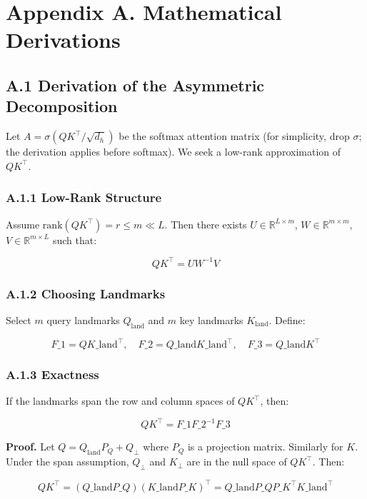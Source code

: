 
\section{Appendix A. Mathematical Derivations}

\subsection{A.1 Derivation of the Asymmetric Decomposition}

Let $A = \sigma(Q K^\top / \sqrt{d_h})$ be the softmax attention matrix (for 
simplicity, drop $\sigma$; the derivation applies before softmax). We seek 
a low-rank approximation of $QK^\top$.

\subsubsection{A.1.1 Low-Rank Structure}

Assume $\text{rank}(QK^\top) = r \le m \ll L$. Then there exists 
$U \in \mathbb{R}^{L \times m}$, $W \in \mathbb{R}^{m \times m}$, 
$V \in \mathbb{R}^{m \times L}$ such that:

\[
QK^\top = U W^{-1} V
\]

\subsubsection{A.1.2 Choosing Landmarks}

Select $m$ query landmarks $Q_\text{land}$ and $m$ key landmarks $K_\text{land}$. 
Define:

\[
F\_1 = Q K\_\text{land}^\top, \quad
F\_2 = Q\_\text{land} K\_\text{land}^\top, \quad
F\_3 = Q\_\text{land} K^\top
\]

\subsubsection{A.1.3 Exactness}

If the landmarks span the row and column spaces of $QK^\top$, then:

\[
Q K^\top = F\_1 F\_2^{-1} F\_3
\]

\textbf{Proof.} Let $Q = Q_\text{land} P_Q + Q_\perp$ where $P_Q$ is a 
projection matrix. Similarly for $K$. Under the span assumption, 
$Q_\perp$ and $K_\perp$ are in the null space of $QK^\top$. Then:

\[
QK^\top = (Q\_\text{land} P\_Q)(K\_\text{land} P\_K)^\top = Q\_\text{land} P\_Q P\_K^\top K\_\text{land}^\top
\]

